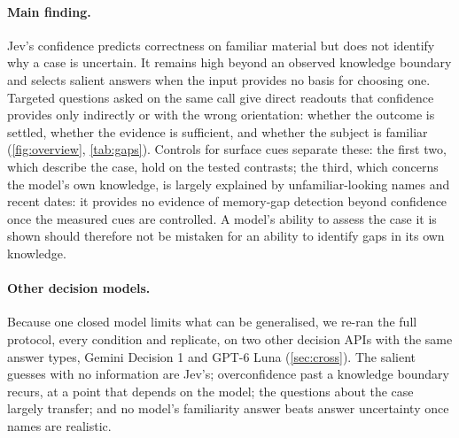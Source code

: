 \documentclass[10pt,twocolumn]{article}
\begin{document}
\paragraph{Main finding.}
Jev's confidence predicts correctness on familiar material but does not
identify why a case is uncertain. It remains high beyond an observed
knowledge boundary and selects salient answers when the input provides no
basis for choosing one. Targeted questions asked on the same call give direct
readouts that confidence provides only indirectly or with the wrong
orientation: whether the outcome is settled, whether the evidence is
sufficient, and whether the subject is familiar
(\cref{fig:overview}, \cref{tab:gaps}). Controls for surface cues separate
these: the first two, which describe the case, hold on the tested contrasts;
the third, which concerns the model's own knowledge, is largely explained by
unfamiliar-looking names and recent dates: it provides no evidence of
memory-gap detection beyond confidence once the measured cues are controlled. A model's ability to assess the case
it is shown should therefore not be mistaken for an ability to identify gaps
in its own knowledge.

\paragraph{Other decision models.} Because one closed model limits what can
be generalised, we re-ran the full protocol, every condition and replicate,
on two other decision APIs with the same answer types, Gemini Decision 1 and
GPT-6 Luna (\cref{sec:cross}). The salient guesses with no information are
Jev's; overconfidence past a knowledge boundary recurs, at a point that
depends on the model; the questions about the case largely transfer; and no
model's familiarity answer beats answer uncertainty once names are realistic.
\end{document}
